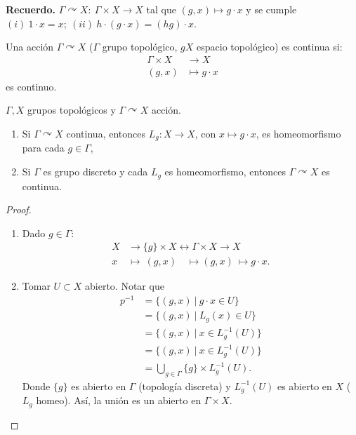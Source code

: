 \textbf{Recuerdo.} $\Gamma \curvearrowright X:\ \Gamma \times X \to X$ tal que $(g,x) \mapsto g\cdot x$ y se cumple $(i)\ 1 \cdot x = x;\ (ii)\ h\cdot(g \cdot x) = (hg) \cdot x$.

\begin{definition}
	Una acción $\Gamma \curvearrowright X$ ($\Gamma $ grupo topológico, $gX$ espacio topológico) es continua si:
	\begin{align*}
		\Gamma \times X & \to X \\
		(g,x) & \mapsto g \cdot x
	\end{align*}
	es continuo.
\end{definition}

\begin{lemma}
	$\Gamma ,X$ grupos topológicos y $\Gamma \curvearrowright X$ acción.
	\begin{enumerate}
		\item Si $\Gamma \curvearrowright X$ continua, entonces $L_g: X \to X$, con $x \mapsto g\cdot x$, es homeomorfismo para cada $g \in \Gamma $,

		\item Si $\Gamma $ es grupo discreto y cada $L_g$ es homeomorfismo, entonces $\Gamma \curvearrowright X$ es continua.
	\end{enumerate}
\end{lemma}
\begin{proof}~
	\begin{enumerate}
		\item Dado $g \in \Gamma$:
		\begin{align*}
			X & \to \{g\} \times X \leftrightarrow \Gamma \times X \to X \\
			x & \mapsto \  (g,x) \quad \mapsto (g,x)  \ \mapsto g \cdot x
		.\end{align*}

		\item Tomar $U \subset X$ abierto. Notar que
		\begin{align*}
			p^{-1} &= \{(g,x) \ \big| \ g \cdot x \in U\} \\
			&= \{(g,x) \ \big| \ L_g(x) \in U \} \\
			&= \{(g,x) \ \big| \ x \in L_g^{-1}(U) \} \\
			&= \{(g,x) \ \big| \ x \in L_{g}^{-1}(U) \} \\
			&= \bigcup_{g\in\Gamma}\{g\} \times L_{g}^{-1}(U) 
		.\end{align*}
		Donde $\{g\}$ es abierto en $\Gamma$ (topología discreta) y $L_{g}^{-1}(U)$ es abierto en $X$ ($L_g$ homeo). Así, la unión es un abierto en $\Gamma \times X$. 
	\end{enumerate}
\end{proof}

